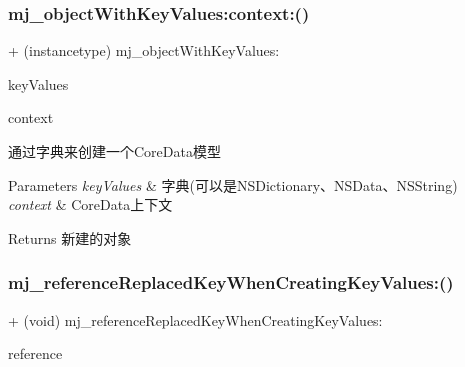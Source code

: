 \subsubsection{\texorpdfstring{mj\+\_\+object\+With\+Key\+Values\+:context\+:()}{mj\_objectWithKeyValues:context:()}\hspace{0.1cm}{\footnotesize\ttfamily [3/3]}}
{\footnotesize\ttfamily + (instancetype) mj\+\_\+object\+With\+Key\+Values\+: \begin{DoxyParamCaption}\item[{(id)}]{key\+Values }\item[{context:(N\+S\+Managed\+Object\+Context $\ast$)}]{context }\end{DoxyParamCaption}}

通过字典来创建一个\+Core\+Data模型 
\begin{DoxyParams}{Parameters}
{\em key\+Values} & 字典(可以是\+N\+S\+Dictionary、\+N\+S\+Data、\+N\+S\+String) \\
\hline
{\em context} & Core\+Data上下文 \\
\hline
\end{DoxyParams}
\begin{DoxyReturn}{Returns}
新建的对象 
\end{DoxyReturn}
\mbox{\label{category_n_s_object_07_m_j_key_value_08_a5ef85ce0a227c02af06d33051a0d77cb}} 
\subsubsection{\texorpdfstring{mj\+\_\+reference\+Replaced\+Key\+When\+Creating\+Key\+Values\+:()}{mj\_referenceReplacedKeyWhenCreatingKeyValues:()}\hspace{0.1cm}{\footnotesize\ttfamily [1/3]}}
{\footnotesize\ttfamily + (void) mj\+\_\+reference\+Replaced\+Key\+When\+Creating\+Key\+Values\+: \begin{DoxyParamCaption}\item[{(B\+O\+OL)}]{reference }\end{DoxyParamCaption}}

